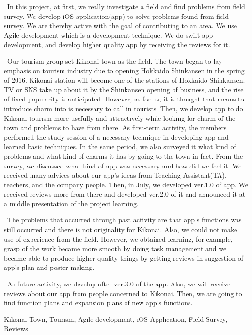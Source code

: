 \documentclass[openany,11pt,papersize]{jsbook}
\begin{document}
\begin{eabstract} 

\ In this project, at first, we really investigate a field and find problems from field survey. We develop iOS application(app) to solve problems found from field survey. We are thereby active with the goal of contributing to an area. We use Agile development which is a development technique. We do swift app development, and develop higher quality app by receiving the reviews for it. 

\ Our tourism group set Kikonai town as the field. The town began to lay emphasis on tourism industry due to opening Hokkaido Shinkansen in the spring of 2016. Kikonai station will become one of the stations of Hokkaido Shinkansen. TV or SNS take up about it by the Shinkansen opening of business, and the rise of fixed popularity is anticipated. However, as for us, it is thought that means to introduce charm into is necessary to call in tourists. Then, we develop app to do Kikonai tourism more usefully and attractively while looking for charm of the town and problems to have from there. As first-term activity, the members performed the study session of a necessary technique in developing app and learned basic techniques. In the same period, we also surveyed it what kind of problems and what kind of charms it has by going to the town in fact. From the survey, we discussed what kind of app was necessary and how did we feel it. We received many advices about our app's ideas from Teaching Assistant(TA), teachers, and the company people. Then, in July, we developed ver.1.0 of app. We received reviews more from there and developed ver.2.0 of it and announced it at a middle presentation of the project learning. 

\ The problems that occurred through past activity are that app's functions was still occurred and there is not originality for Kikonai. Also, we could not make use of experience from the field. However, we obtained learning, for example, grasp of the work became more smooth by doing task management and we became able to produce higher quality things by getting reviews in suggestion of app's plan and poster making. 

\ As future activity, we develop after ver.3.0 of the app. Also, we will receive reviews about our app from people concerned to Kikonai. Then, we are going to find function plans and expansion plans of new app's functions.


\begin{ekeyword}
Kikonai Town, Tourism, Agile development, iOS Application, Field Survey, Reviews
\end{ekeyword}
\end{eabstract}
\end{document}
